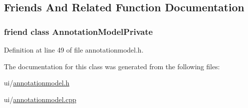 \subsection{Friends And Related Function Documentation}
\hypertarget{classAnnotationModel_adf657526a839f970d4c676cfc4853964}{
\subsubsection[{Annotation\+Model\+Private}]{\setlength{\rightskip}{0pt plus 5cm}friend class {\bf Annotation\+Model\+Private}\hspace{0.3cm}{\ttfamily [friend]}}}\label{classAnnotationModel_adf657526a839f970d4c676cfc4853964}


Definition at line 49 of file annotationmodel.\+h.



The documentation for this class was generated from the following files\+:\begin{DoxyCompactItemize}
\item 
ui/\hyperlink{annotationmodel_8h}{annotationmodel.\+h}\item 
ui/\hyperlink{annotationmodel_8cpp}{annotationmodel.\+cpp}\end{DoxyCompactItemize}
